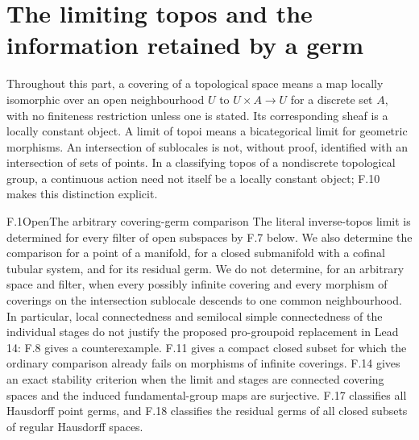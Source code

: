 \section{The limiting topos and the information retained by a germ}

Throughout this part, a covering of a topological space means a map
locally isomorphic over an open neighbourhood $U$ to $U\times A\to U$
for a discrete set $A$, with no finiteness restriction unless one is
stated. Its corresponding sheaf is a locally constant object. A limit
of topoi means a bicategorical
limit for geometric morphisms. An intersection of sublocales is not,
without proof, identified with an intersection of sets of points.
In a classifying topos of a nondiscrete topological group, a continuous
action need not itself be a locally constant object; F.10 makes this
distinction explicit.

\begin{statement}{F.1}{Open}{The arbitrary covering-germ comparison}
The literal inverse-topos limit is determined for every filter of open
subspaces by F.7 below. We also determine the comparison for a point of a
manifold, for a closed submanifold with a cofinal tubular system, and for
its residual germ. We do not determine, for an arbitrary space and filter,
when every possibly infinite covering and every morphism of coverings on
the intersection sublocale descends to one common neighbourhood. In
particular, local connectedness and semilocal simple connectedness of the
individual stages do not justify the proposed pro-groupoid replacement
in Lead 14: F.8 gives a counterexample.
F.11 gives a compact closed subset for which the ordinary comparison
already fails on morphisms of infinite coverings. F.14 gives an exact
stability criterion when the limit and stages are connected covering
spaces and the induced fundamental-group maps are surjective.
F.17 classifies all Hausdorff point germs, and F.18 classifies the
residual germs of all closed subsets of regular Hausdorff spaces.
\end{statement}

